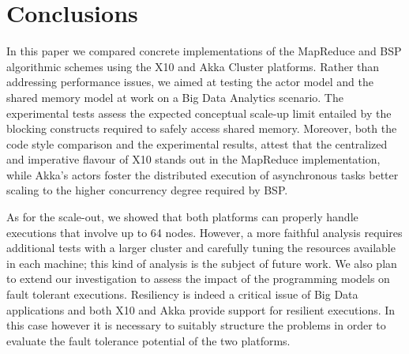 \documentclass[a4paper]{article}
\numberwithin{equation}{section}
\begin{document}
\section{Conclusions}
\label{sec:conclusions}
In this paper we compared concrete implementations of the MapReduce
and BSP algorithmic schemes using the X10 and Akka Cluster platforms.
Rather than addressing performance issues, we aimed at testing the
actor model and the shared memory model at work on a Big Data
Analytics scenario. The experimental tests assess the expected
conceptual scale-up limit entailed by the blocking constructs required
to safely access shared memory.
Moreover, both the code style comparison and the
experimental results, attest that the centralized and imperative
flavour of X10 stands out in the MapReduce implementation, while
Akka's actors foster the distributed execution of asynchronous tasks
better scaling to the higher concurrency degree required by BSP.

As for the scale-out, 
we showed that both platforms can properly 
handle executions that involve up to 64 nodes. However, a more
faithful analysis requires additional tests with a larger cluster and
carefully tuning the resources available in each machine; this kind of
analysis is the subject of future work. 
We also plan to extend our investigation to assess the impact of the
programming models on fault tolerant executions. Resiliency is indeed
a critical issue of Big Data applications and both X10 and Akka
provide support for resilient executions.
In this case however it is necessary to suitably structure the
problems in order to evaluate the fault tolerance potential of the two
platforms.
\end{document}
